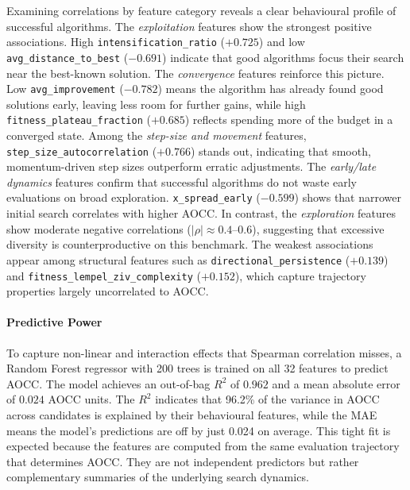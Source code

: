 Examining correlations by feature category reveals a clear behavioural profile of successful algorithms. The \emph{exploitation} features show the strongest positive associations. High \texttt{intensification\_ratio} ($+0.725$) and low \texttt{avg\_distance\_to\_best} ($-0.691$) indicate that good algorithms focus their search near the best-known solution. The \emph{convergence} features reinforce this picture. Low \texttt{avg\_improvement} ($-0.782$) means the algorithm has already found good solutions early, leaving less room for further gains, while high \texttt{fitness\_plateau\_fraction} ($+0.685$) reflects spending more of the budget in a converged state. Among the \emph{step-size and movement} features, \texttt{step\_size\_autocorrelation} ($+0.766$) stands out, indicating that smooth, momentum-driven step sizes outperform erratic adjustments. The \emph{early/late dynamics} features confirm that successful algorithms do not waste early evaluations on broad exploration. \texttt{x\_spread\_early} ($-0.599$) shows that narrower initial search correlates with higher AOCC. In contrast, the \emph{exploration} features show moderate negative correlations ($|\rho| \approx 0.4$--$0.6$), suggesting that excessive diversity is counterproductive on this benchmark. The weakest associations appear among structural features such as \texttt{directional\_persistence} ($+0.139$) and \texttt{fitness\_lempel\_ziv\_complexity} ($+0.152$), which capture trajectory properties largely uncorrelated to AOCC.

\paragraph{Predictive Power}
\label{sec:results-rf}

To capture non-linear and interaction effects that Spearman correlation misses, a Random Forest regressor with 200 trees is trained on all 32 features to predict AOCC. The model achieves an out-of-bag $R^2$ of $0.962$ and a mean absolute error of $0.024$ AOCC units. The $R^2$ indicates that 96.2\% of the variance in AOCC across candidates is explained by their behavioural features, while the MAE means the model's predictions are off by just 0.024 on average. This tight fit is expected because the features are computed from the same evaluation trajectory that determines AOCC. They are not independent predictors but rather complementary summaries of the underlying search dynamics.

